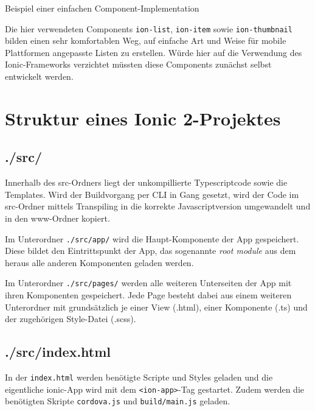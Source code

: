 \begin{listing}[htb]
    
    \caption{Beispiel einer einfachen Component-Implementation}
    \label{lst:ionicExampleTs}
\end{listing}

Die hier verwendeten Components \texttt{ion-list}, \texttt{ion-item} sowie \texttt{ion-thumbnail} bilden einen sehr komfortablen Weg, auf einfache Art und Weise für mobile Plattformen angepasste Listen zu erstellen. Würde hier auf die Verwendung des Ionic-Frameworks verzichtet müssten diese Components zunächst selbst entwickelt werden.
%
%
%

\section{Struktur eines Ionic 2-Projektes} 
\subsection*{./src/}
%
%
Innerhalb des src-Ordners liegt der unkompillierte Typescriptcode sowie die Templates. Wird der Buildvorgang per CLI in Gang gesetzt, wird der Code im src-Ordner mittels Transpiling in die korrekte Javascriptversion umgewandelt und in den www-Ordner kopiert.

Im Unterordner \texttt{./src/app/} wird die Haupt-Komponente der App gespeichert. Diese bildet den Eintrittspunkt der App, das sogenannte \emph{root module} aus dem heraus alle anderen Komponenten geladen werden.

Im Unterordner \texttt{./src/pages/} werden alle weiteren Unterseiten der App mit ihren Komponenten gespeichert. Jede Page besteht dabei aus einem weiteren Unterordner mit grundsätzlich je einer View (.html), einer Komponente (.ts) und der zugehörigen Style-Datei (.scss).
%
\subsection*{./src/index.html}
In der \texttt{index.html} werden benötigte Scripte und Styles geladen und die eigentliche ionic-App wird mit dem \texttt{<ion-app>}-Tag gestartet. Zudem werden die benötigten Skripte \texttt{cordova.js} und \texttt{build/main.js} geladen.
%
